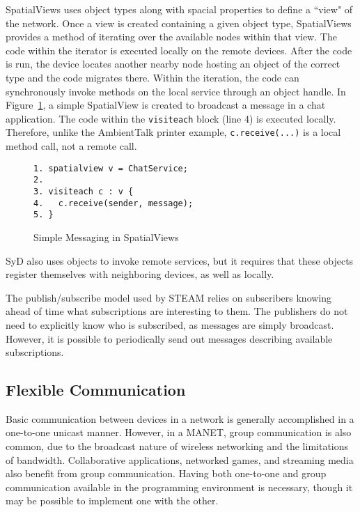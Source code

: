 \documentclass{sig-alternate}
\begin{document}
SpatialViews uses object types along with spacial properties to define a ``view" of the network. Once a view is created containing a given object type, SpatialViews provides a method of iterating over the available nodes within that view. The code within the iterator is executed locally on the remote devices. After the code is run, the device locates another nearby node hosting an object of the correct type and the code migrates there. Within the iteration, the code can synchronously invoke methods on the local service through an object handle. In Figure~\ref{fig:svsm}, a simple SpatialView is created to broadcast a message in a chat application. The code within the \texttt{visiteach} block (line 4) is executed locally. Therefore, unlike the AmbientTalk printer example, \texttt{c.receive(...)} is a local method call, not a remote call.

\begin{figure}
\centering
\begin{verbatim}
1. spatialview v = ChatService;
2.
3. visiteach c : v {
4.   c.receive(sender, message);
5. }
\end{verbatim}
\caption{Simple Messaging in SpatialViews}
\label{fig:svsm}
\end{figure}

SyD also uses objects to invoke remote services, but it requires that these objects register themselves with neighboring devices, as well as locally. \begin{comment}YCab is interesting in that it allows applications to detect nearby sessions, then suggest a handle for themselves. If the handle is unique in the session, the client is allowed to join, otherwise the client is rejected. \end{comment}

The publish/subscribe model used by STEAM relies on subscribers knowing ahead of time what subscriptions are interesting to them. The publishers do not need to explicitly know who is subscribed, as messages are simply broadcast. However, it is possible to periodically send out messages describing available subscriptions.

\subsection{Flexible Communication}

Basic communication between devices in a network is generally accomplished in a one-to-one unicast manner. However, in a MANET, group communication is also common, due to the broadcast nature of wireless networking and the limitations of bandwidth. Collaborative applications, networked games, and streaming media also benefit from group communication. Having both one-to-one and group communication available in the programming environment is necessary, though it may be possible to implement one with the other.
\end{document}
